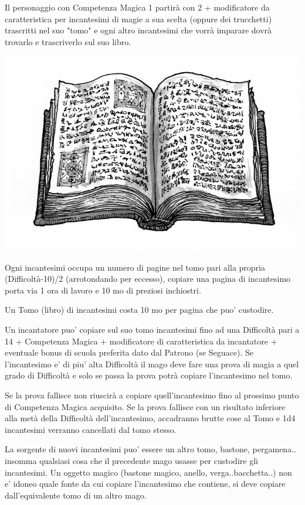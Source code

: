 \begin{multicols}{2}
Il personaggio con Competenza Magica 1 partirà con 2 + modificatore da caratteristica per incantesimi di magie a sua scelta (oppure dei trucchetti) trascritti nel suo "tomo" e ogni altro incantesimi che vorrà imparare dovrà trovarlo e trascriverlo sul suo libro.

\includegraphics[width=0.8\linewidth]{immagini/spellbook.jpg}

Ogni incantesimi occupa un numero di pagine nel tomo pari alla propria (Difficoltà-10)/2 (arrotondando per eccesso), copiare una pagina di incantesimo porta via 1 ora di lavoro e 10 mo di preziosi inchiostri.

Un Tomo (libro) di incantesimi costa 10 mo per pagina che puo' custodire.

Un incantatore puo' copiare sul suo tomo incantesimi fino ad una Difficoltà pari a 14 + Competenza Magica + modificatore di caratteristica da incantatore + eventuale bonus di scuola preferita dato dal Patrono (se Seguace). Se l'incantesimo e' di piu' alta Difficoltà il mago deve fare una prova di magia a quel grado di Difficoltà e solo se passa la prova potrà copiare l'incantesimo nel tomo.

Se la prova fallisce non riuscirà a copiare quell'incantesimo fino al prossimo punto di Competenza Magica acquisito. Se la prova fallisce con un risultato inferiore alla metà della Difficoltà dell'incantesimo, accadranno brutte cose al Tomo e 1d4 incantesimi verranno cancellati dal tomo stesso.

La sorgente di nuovi incantesimi puo' essere un altro tomo, bastone, pergamena.. insomma qualsiasi cosa che il precedente mago usasse per custodire gli incantesimi. Un oggetto magico (bastone magico, anello, verga..bacchetta..) non e' idoneo quale fonte da cui copiare l'incantesimo che contiene, si deve copiare dall'equivalente tomo di un altro mago.


\end{multicols}
